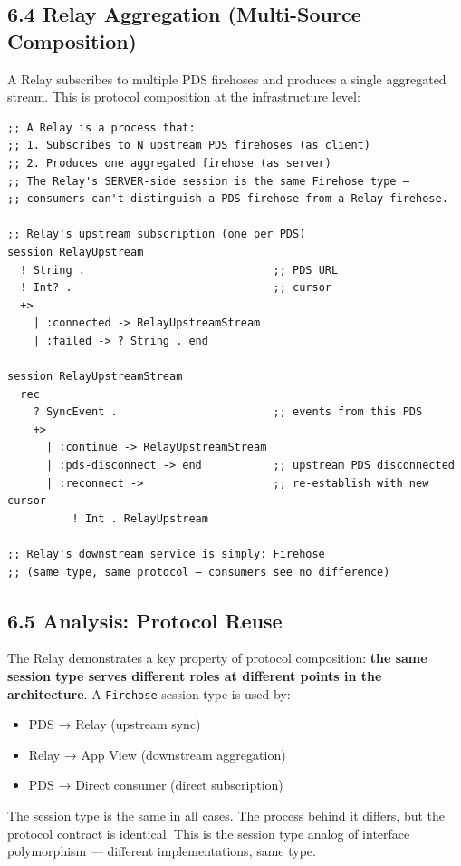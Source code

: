 \documentclass[11pt]{article}
\begin{document}
\subsection{6.4 Relay Aggregation (Multi-Source Composition)}
\label{sec:org463d6bc}

A Relay subscribes to multiple PDS firehoses and produces a single aggregated
stream. This is protocol composition at the infrastructure level:

\begin{verbatim}
;; A Relay is a process that:
;; 1. Subscribes to N upstream PDS firehoses (as client)
;; 2. Produces one aggregated firehose (as server)
;; The Relay's SERVER-side session is the same Firehose type —
;; consumers can't distinguish a PDS firehose from a Relay firehose.

;; Relay's upstream subscription (one per PDS)
session RelayUpstream
  ! String .                             ;; PDS URL
  ! Int? .                               ;; cursor
  +>
    | :connected -> RelayUpstreamStream
    | :failed -> ? String . end

session RelayUpstreamStream
  rec
    ? SyncEvent .                        ;; events from this PDS
    +>
      | :continue -> RelayUpstreamStream
      | :pds-disconnect -> end           ;; upstream PDS disconnected
      | :reconnect ->                    ;; re-establish with new cursor
          ! Int . RelayUpstream

;; Relay's downstream service is simply: Firehose
;; (same type, same protocol — consumers see no difference)
\end{verbatim}
\subsection{6.5 Analysis: Protocol Reuse}
\label{sec:orgae428c6}

The Relay demonstrates a key property of protocol composition: \textbf{the same
session type serves different roles at different points in the architecture}.
A \texttt{Firehose} session type is used by:

\begin{itemize}
\item PDS → Relay (upstream sync)
\item Relay → App View (downstream aggregation)
\item PDS → Direct consumer (direct subscription)
\end{itemize}

The session type is the same in all cases. The process behind it differs,
but the protocol contract is identical. This is the session type analog of
interface polymorphism --- different implementations, same type.
\end{document}
